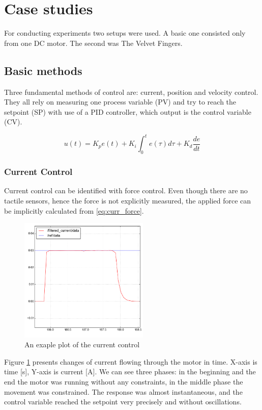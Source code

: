 \section{Case studies}
For conducting experiments two setups were used. A basic one consisted only from one DC motor. The second was \textsf{The Velvet Fingers}.

\subsection{Basic methods}
Three fundamental methods of control are: current, position and velocity control. They all rely on measuring one process variable (PV) and try to reach the setpoint (SP) with use of a PID controller, which output is the control variable (CV).

\begin{equation}
u(t) = K_p e(t) + K_i \int_{0}^{t}e(\tau)d\tau + K_d \frac{de}{dt} 
\end{equation}

\subsubsection{Current Control}
Current control can be identified with force control. Even though there are no tactile sensors, hence the force is not explicitly measured, the  applied force can be implicitly calculated from \ref{eq:curr_force}. 

\begin{figure}%
 \begin{center} 
  \includegraphics[width=0.55\textwidth]{./stuff/filtered_current}
 \end{center}
 \caption{An exaple plot of the current control}
 \label{fig:current_plot} 
\end{figure}   

Figure \ref{fig:current_plot} presents changes of current flowing through the motor in time. X-axis is time [s], Y-axis is current [A]. We can see three phases: in the beginning and the end the motor was running without any constraints, in the middle phase the movement was constrained.
The response was almost instantaneous, and the control variable reached the setpoint very precisely and without oscillations. 

